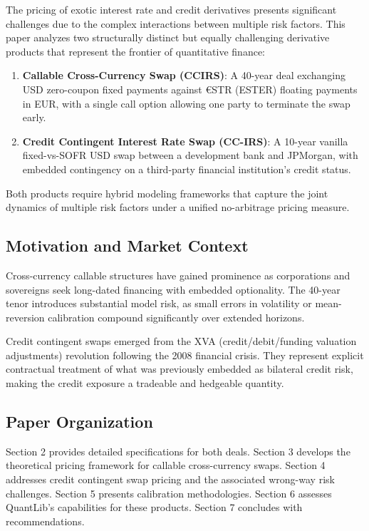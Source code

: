 \documentclass[11pt,a4paper]{article}
\theoremstyle{definition}
\begin{document}
The pricing of exotic interest rate and credit derivatives presents significant challenges due to the complex interactions between multiple risk factors. This paper analyzes two structurally distinct but equally challenging derivative products that represent the frontier of quantitative finance:

\begin{enumerate}
    \item \textbf{Callable Cross-Currency Swap (CCIRS)}: A 40-year deal exchanging USD zero-coupon fixed payments against €STR (ESTER) floating payments in EUR, with a single call option allowing one party to terminate the swap early.

    \item \textbf{Credit Contingent Interest Rate Swap (CC-IRS)}: A 10-year vanilla fixed-vs-SOFR USD swap between a development bank and JPMorgan, with embedded contingency on a third-party financial institution's credit status.
\end{enumerate}

Both products require hybrid modeling frameworks that capture the joint dynamics of multiple risk factors under a unified no-arbitrage pricing measure.

\subsection{Motivation and Market Context}

Cross-currency callable structures have gained prominence as corporations and sovereigns seek long-dated financing with embedded optionality. The 40-year tenor introduces substantial model risk, as small errors in volatility or mean-reversion calibration compound significantly over extended horizons.

Credit contingent swaps emerged from the XVA (credit/debit/funding valuation adjustments) revolution following the 2008 financial crisis. They represent explicit contractual treatment of what was previously embedded as bilateral credit risk, making the credit exposure a tradeable and hedgeable quantity.

\subsection{Paper Organization}

Section 2 provides detailed specifications for both deals. Section 3 develops the theoretical pricing framework for callable cross-currency swaps. Section 4 addresses credit contingent swap pricing and the associated wrong-way risk challenges. Section 5 presents calibration methodologies. Section 6 assesses QuantLib's capabilities for these products. Section 7 concludes with recommendations.
\end{document}
